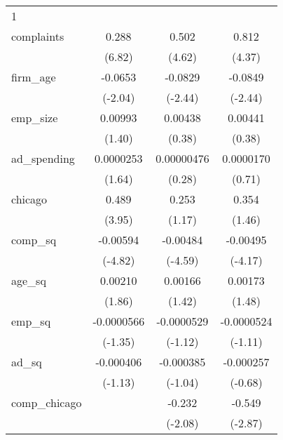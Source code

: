 {\begin{tabular}{l*{3}{c}}
\hline
1           &                     &                     &                     \\
complaints  &       0.288\sym{***}&       0.502\sym{***}&       0.812\sym{***}\\
            &      (6.82)         &      (4.62)         &      (4.37)         \\
[1em]
firm\_age    &     -0.0653\sym{*}  &     -0.0829\sym{*}  &     -0.0849\sym{*}  \\
            &     (-2.04)         &     (-2.44)         &     (-2.44)         \\
[1em]
emp\_size    &     0.00993         &     0.00438         &     0.00441         \\
            &      (1.40)         &      (0.38)         &      (0.38)         \\
[1em]
ad\_spending &   0.0000253         &  0.00000476         &   0.0000170         \\
            &      (1.64)         &      (0.28)         &      (0.71)         \\
[1em]
chicago     &       0.489\sym{***}&       0.253         &       0.354         \\
            &      (3.95)         &      (1.17)         &      (1.46)         \\
[1em]
comp\_sq     &    -0.00594\sym{***}&    -0.00484\sym{***}&    -0.00495\sym{***}\\
            &     (-4.82)         &     (-4.59)         &     (-4.17)         \\
[1em]
age\_sq      &     0.00210         &     0.00166         &     0.00173         \\
            &      (1.86)         &      (1.42)         &      (1.48)         \\
[1em]
emp\_sq      &  -0.0000566         &  -0.0000529         &  -0.0000524         \\
            &     (-1.35)         &     (-1.12)         &     (-1.11)         \\
[1em]
ad\_sq       &   -0.000406         &   -0.000385         &   -0.000257         \\
            &     (-1.13)         &     (-1.04)         &     (-0.68)         \\
[1em]
comp\_chicago&                     &      -0.232\sym{*}  &      -0.549\sym{**} \\
            &                     &     (-2.08)         &     (-2.87)         \\

\end{tabular}}
